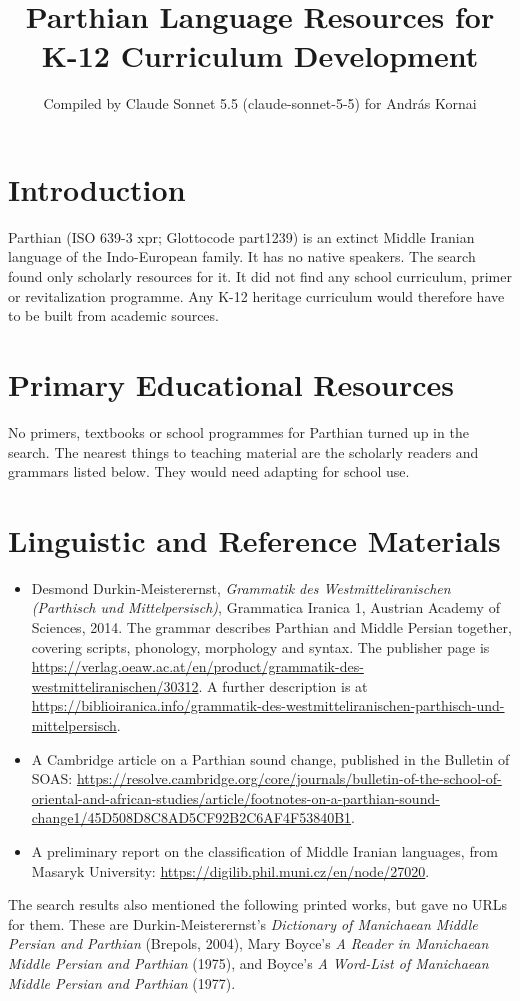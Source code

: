 \documentclass[12pt]{article}
\title{Parthian Language Resources for K-12 Curriculum Development}
\author{Compiled by Claude Sonnet 5.5 (claude-sonnet-5-5) for Andr\'as Kornai}
\date{}
\begin{document}
\maketitle

\section{Introduction}
Parthian (ISO 639-3 xpr; Glottocode part1239) is an extinct Middle Iranian language of the Indo-European family. It has no native speakers. The search found only scholarly resources for it. It did not find any school curriculum, primer or revitalization programme. Any K-12 heritage curriculum would therefore have to be built from academic sources.

\section{Primary Educational Resources}
No primers, textbooks or school programmes for Parthian turned up in the search. The nearest things to teaching material are the scholarly readers and grammars listed below. They would need adapting for school use.

\section{Linguistic and Reference Materials}
\begin{itemize}
\item Desmond Durkin-Meisterernst, \emph{Grammatik des Westmitteliranischen (Parthisch und Mittelpersisch)}, Grammatica Iranica 1, Austrian Academy of Sciences, 2014. The grammar describes Parthian and Middle Persian together, covering scripts, phonology, morphology and syntax. The publisher page is \url{https://verlag.oeaw.ac.at/en/product/grammatik-des-westmitteliranischen/30312}. A further description is at \url{https://biblioiranica.info/grammatik-des-westmitteliranischen-parthisch-und-mittelpersisch}.
\item A Cambridge article on a Parthian sound change, published in the Bulletin of SOAS: \url{https://resolve.cambridge.org/core/journals/bulletin-of-the-school-of-oriental-and-african-studies/article/footnotes-on-a-parthian-sound-change1/45D508D8C8AD5CF92B2C6AF4F53840B1}.
\item A preliminary report on the classification of Middle Iranian languages, from Masaryk University: \url{https://digilib.phil.muni.cz/en/node/27020}.
\end{itemize}
The search results also mentioned the following printed works, but gave no URLs for them. These are Durkin-Meisterernst's \emph{Dictionary of Manichaean Middle Persian and Parthian} (Brepols, 2004), Mary Boyce's \emph{A Reader in Manichaean Middle Persian and Parthian} (1975), and Boyce's \emph{A Word-List of Manichaean Middle Persian and Parthian} (1977).
\end{document}
